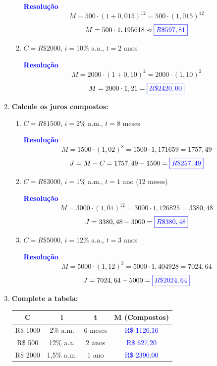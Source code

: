 \documentclass[11pt]{article}
\newcommand{\resposta}[1]{\textcolor{blue}{\boxed{#1}}}
\begin{document}
\begin{multicols}{2}
\begin{enumerate}[leftmargin=*]
\begin{enumerate}[label=\alph*)]
\textbf{\textcolor{blue}{Resolução}}
\[
M = 500 \cdot (1 + 0,015)^{12} = 500 \cdot (1,015)^{12}
\]
\[
M = 500 \cdot 1,195618 \approx \resposta{R\$ 597,81}
\]

\item $C = R\$ 2000$, $i = 10\%$ a.a., $t = 2$ anos

\textbf{\textcolor{blue}{Resolução}}
\[
M = 2000 \cdot (1 + 0,10)^2 = 2000 \cdot (1,10)^2
\]
\[
M = 2000 \cdot 1,21 = \resposta{R\$ 2420,00}
\]
\end{enumerate}

\item \textbf{Calcule os juros compostos:}

\begin{enumerate}[label=\alph*)]
\item $C = R\$ 1500$, $i = 2\%$ a.m., $t = 8$ meses

\textbf{\textcolor{blue}{Resolução}}
\[
M = 1500 \cdot (1,02)^8 = 1500 \cdot 1,171659 = 1757,49
\]
\[
J = M - C = 1757,49 - 1500 = \resposta{R\$ 257,49}
\]

\item $C = R\$ 3000$, $i = 1\%$ a.m., $t = 1$ ano (12 meses)

\textbf{\textcolor{blue}{Resolução}}
\[
M = 3000 \cdot (1,01)^{12} = 3000 \cdot 1,126825 = 3380,48
\]
\[
J = 3380,48 - 3000 = \resposta{R\$ 380,48}
\]

\item $C = R\$ 5000$, $i = 12\%$ a.a., $t = 3$ anos

\textbf{\textcolor{blue}{Resolução}}
\[
M = 5000 \cdot (1,12)^3 = 5000 \cdot 1,404928 = 7024,64
\]
\[
J = 7024,64 - 5000 = \resposta{R\$ 2024,64}
\]
\end{enumerate}

\item \textbf{Complete a tabela:}

\begin{center}
\begin{tabular}{|c|c|c|c|}
\hline
\textbf{C} & \textbf{i} & \textbf{t} & \textbf{M (Compostos)} \\
\hline
R\$ 1000 & 2\% a.m. & 6 meses & \textcolor{blue}{R\$ 1126,16} \\
\hline
R\$ 500 & 12\% a.a. & 2 anos & \textcolor{blue}{R\$ 627,20} \\
\hline
R\$ 2000 & 1,5\% a.m. & 1 ano & \textcolor{blue}{R\$ 2390,00} \\
\hline
\end{tabular}
\end{center}


\end{enumerate}
\end{multicols}
\end{document}
